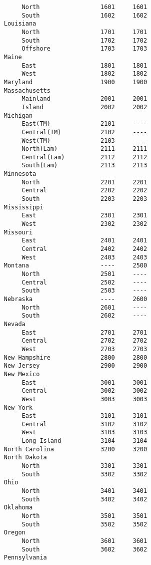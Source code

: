 \begin{verbatim}
          North                 1601     1601
          South                 1602     1602
     Louisiana
          North                 1701     1701
          South                 1702     1702
          Offshore              1703     1703
     Maine
          East                  1801     1801
          West                  1802     1802
     Maryland                   1900     1900
     Massachusetts
          Mainland              2001     2001
          Island                2002     2002
     Michigan
          East(TM)              2101     ----
          Central(TM)           2102     ----
          West(TM)              2103     ----
          North(Lam)            2111     2111
          Central(Lam)          2112     2112
          South(Lam)            2113     2113
     Minnesota
          North                 2201     2201
          Central               2202     2202
          South                 2203     2203
     Mississippi
          East                  2301     2301
          West                  2302     2302
     Missouri
          East                  2401     2401
          Central               2402     2402
          West                  2403     2403
     Montana                    ----     2500
          North                 2501     ----
          Central               2502     ----
          South                 2503     ----
     Nebraska                   ----     2600
          North                 2601     ----
          South                 2602     ----
     Nevada
          East                  2701     2701
          Central               2702     2702
          West                  2703     2703
     New Hampshire              2800     2800
     New Jersey                 2900     2900
     New Mexico
          East                  3001     3001
          Central               3002     3002
          West                  3003     3003
     New York
          East                  3101     3101
          Central               3102     3102
          West                  3103     3103
          Long Island           3104     3104
     North Carolina             3200     3200
     North Dakota
          North                 3301     3301
          South                 3302     3302
     Ohio
          North                 3401     3401
          South                 3402     3402
     Oklahoma
          North                 3501     3501
          South                 3502     3502
     Oregon
          North                 3601     3601
          South                 3602     3602
     Pennsylvania

\end{verbatim}
